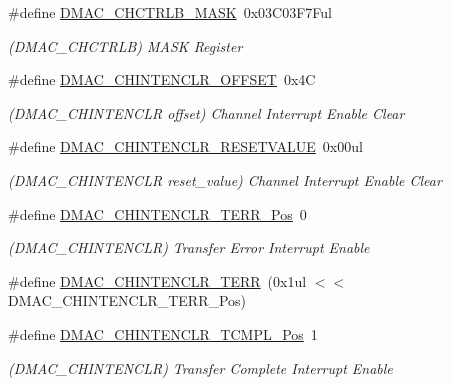 \begin{DoxyCompactItemize}
\item 
\#define \mbox{\hyperlink{group___s_a_m_d21___d_m_a_c_gaf5f6415e0cfb9acbeb58874888edcbe9}{D\+M\+A\+C\+\_\+\+C\+H\+C\+T\+R\+L\+B\+\_\+\+M\+A\+SK}}~0x03\+C03\+F7\+Ful
\begin{DoxyCompactList}\small\item\em (D\+M\+A\+C\+\_\+\+C\+H\+C\+T\+R\+LB) M\+A\+SK Register \end{DoxyCompactList}\item 
\#define \mbox{\hyperlink{group___s_a_m_d21___d_m_a_c_gacdf58e67992136562ea21ed243cfd4be}{D\+M\+A\+C\+\_\+\+C\+H\+I\+N\+T\+E\+N\+C\+L\+R\+\_\+\+O\+F\+F\+S\+ET}}~0x4C
\begin{DoxyCompactList}\small\item\em (D\+M\+A\+C\+\_\+\+C\+H\+I\+N\+T\+E\+N\+C\+LR offset) Channel Interrupt Enable Clear \end{DoxyCompactList}\item 
\#define \mbox{\hyperlink{group___s_a_m_d21___d_m_a_c_ga605cb951c3e2debb4b5800d015862810}{D\+M\+A\+C\+\_\+\+C\+H\+I\+N\+T\+E\+N\+C\+L\+R\+\_\+\+R\+E\+S\+E\+T\+V\+A\+L\+UE}}~0x00ul
\begin{DoxyCompactList}\small\item\em (D\+M\+A\+C\+\_\+\+C\+H\+I\+N\+T\+E\+N\+C\+LR reset\+\_\+value) Channel Interrupt Enable Clear \end{DoxyCompactList}\item 
\#define \mbox{\hyperlink{group___s_a_m_d21___d_m_a_c_ga7896201350f25ec31ca8231659c0faee}{D\+M\+A\+C\+\_\+\+C\+H\+I\+N\+T\+E\+N\+C\+L\+R\+\_\+\+T\+E\+R\+R\+\_\+\+Pos}}~0
\begin{DoxyCompactList}\small\item\em (D\+M\+A\+C\+\_\+\+C\+H\+I\+N\+T\+E\+N\+C\+LR) Transfer Error Interrupt Enable \end{DoxyCompactList}\item 
\#define \mbox{\hyperlink{group___s_a_m_d21___d_m_a_c_gae0c2f9d2b22d8e0bd06a535aa83a9bbe}{D\+M\+A\+C\+\_\+\+C\+H\+I\+N\+T\+E\+N\+C\+L\+R\+\_\+\+T\+E\+RR}}~(0x1ul $<$$<$ D\+M\+A\+C\+\_\+\+C\+H\+I\+N\+T\+E\+N\+C\+L\+R\+\_\+\+T\+E\+R\+R\+\_\+\+Pos)
\item 
\#define \mbox{\hyperlink{group___s_a_m_d21___d_m_a_c_gab02512335095b2ff57b466ad814d7ebd}{D\+M\+A\+C\+\_\+\+C\+H\+I\+N\+T\+E\+N\+C\+L\+R\+\_\+\+T\+C\+M\+P\+L\+\_\+\+Pos}}~1
\begin{DoxyCompactList}\small\item\em (D\+M\+A\+C\+\_\+\+C\+H\+I\+N\+T\+E\+N\+C\+LR) Transfer Complete Interrupt Enable \end{DoxyCompactList}\item 
$$
\end{DoxyCompactItemize}
